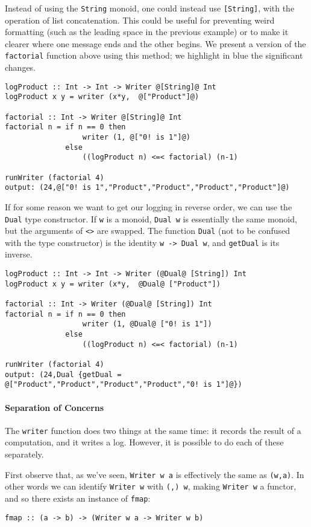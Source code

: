 \documentclass[11pt]{article}
\theoremstyle{nonumberplain}
\newcommand*\lsin{\lstinline}
\begin{document}
Instead of using the \lsin|String| monoid, one could instead use \mbox{\lsin|[String]|}, with the operation of list concatenation. This could be useful for preventing weird formatting (such as the leading space in the previous example) or to make it clearer where one message ends and the other begins. We present a version of the \lsin|factorial| function above using this method; we highlight in {\color{blue} blue} the significant changes.
\begin{lstlisting}
logProduct :: Int -> Int -> Writer @[String]@ Int
logProduct x y = writer (x*y,  @["Product"]@)

factorial :: Int -> Writer @[String]@ Int
factorial n = if n == 0 then
                  writer (1, @["0! is 1"]@) 
              else
                  ((logProduct n) <=< factorial) (n-1)

runWriter (factorial 4)
output: (24,@["0! is 1","Product","Product","Product","Product"]@)
\end{lstlisting}

If for some reason we want to get our logging in reverse order, we can use the \lsin|Dual| type constructor. If \lsin|w| is a monoid, \lsin|Dual w| is essentially the same monoid, but the arguments of \lsin|<>| are swapped. The function \lsin|Dual| (not to be confused with the type constructor) is the identity \lsin|w -> Dual w|, and \lsin|getDual| is its inverse.
\begin{lstlisting}
logProduct :: Int -> Int -> Writer (@Dual@ [String]) Int
logProduct x y = writer (x*y,  @Dual@ ["Product"])

factorial :: Int -> Writer (@Dual@ [String]) Int
factorial n = if n == 0 then
                  writer (1, @Dual@ ["0! is 1"]) 
              else
                  ((logProduct n) <=< factorial) (n-1)

runWriter (factorial 4)
output: (24,Dual {getDual = @["Product","Product","Product","Product","0! is 1"]@})
\end{lstlisting}

\paragraph{Separation of Concerns}
The \lsin|writer| function does two things at the same time: it records the result of a computation, and it writes a log. However, it is possible to do each of these separately.

First observe that, as we've seen, \lsin|Writer w a| is effectively the same as \lsin|(w,a)|. In other words we can identify \lsin|Writer w| with \lsin|(,) w|, making \lsin|Writer w| a functor, and so there exists an instance of \lsin|fmap|:
\begin{lstlisting}
fmap :: (a -> b) -> (Writer w a -> Writer w b)
\end{lstlisting}
\end{document}
